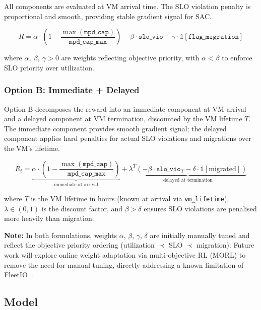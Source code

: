 \documentclass[11pt]{article}
\begin{document}
All components are evaluated at VM arrival time. The SLO violation penalty
is proportional and smooth, providing stable gradient signal for SAC.

\begin{equation}
    R = \alpha \cdot \left(1 - \frac{\max(\texttt{mpd\_cap})}{\texttt{mpd\_cap\_max}}\right)
      - \beta \cdot \texttt{slo\_vio}
      - \gamma \cdot \mathbb{1}[\texttt{flag\_migration}]
    \label{eq:reward_a}
\end{equation}

where $\alpha,\ \beta,\ \gamma > 0$ are weights reflecting objective priority,
with $\alpha < \beta$ to enforce SLO priority over utilization.

\subsubsection*{Option B: Immediate + Delayed}

Option B decomposes the reward into an immediate component at VM arrival
and a delayed component at VM termination, discounted by the VM lifetime $T$.
The immediate component provides smooth gradient signal; the delayed component
applies hard penalties for actual SLO violations and migrations over the
VM's lifetime.

\begin{equation}
    R_t = \underbrace{\alpha \cdot \left(1 - \frac{\max(\texttt{mpd\_cap})}{\texttt{mpd\_cap\_max}}\right)}_{\text{immediate at arrival}}
        + \underbrace{\lambda^{T} \left(- \beta \cdot \texttt{slo\_vio}_{T} - \delta \cdot \mathbb{1}[\text{migrated}]\right)}_{\text{delayed at termination}}
    \label{eq:reward_b}
\end{equation}

where $T$ is the VM lifetime in hours (known at arrival via \texttt{vm\_lifetime}),
$\lambda \in (0,1)$ is the discount factor, and $\beta > \delta$ ensures SLO
violations are penalised more heavily than migration.

\noindent\textbf{Note:} In both formulations, weights $\alpha$, $\beta$,
$\gamma$, $\delta$ are initially manually tuned and reflect the objective
priority ordering (utilization $\prec$ SLO $\prec$ migration). Future work
will explore online weight adaptation via multi-objective RL (MORL) to remove
the need for manual tuning, directly addressing a known limitation of
FleetIO~\cite{fleetio2025}.

\subsection{Model}
\label{sec:model}
\end{document}
